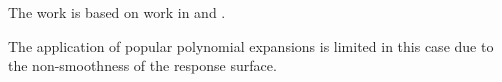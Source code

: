The work is based on work in \cite{klimke2006} and \cite{ma2009}.

The application of popular polynomial expansions is limited in this case due to
the non-smoothness of the response surface.
